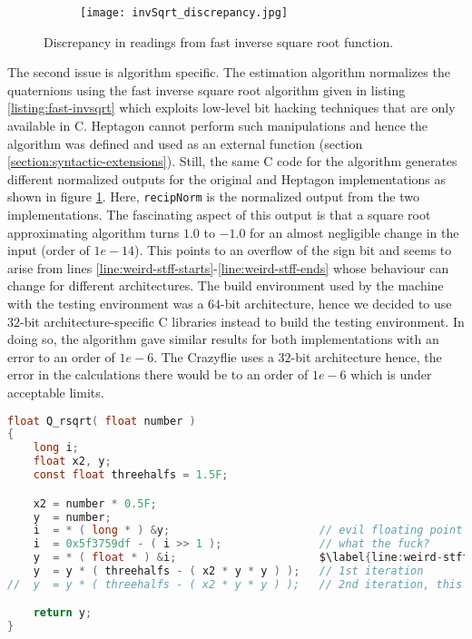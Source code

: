 \documentclass[10pt, a4paper]{article}
\newcommand{\code}[1]{\texttt{#1}}
\begin{document}
    \begin{figure}[hbt!]
        \centering
        \begin{subfigure}[b]{0.99\textwidth}
            \centering
            \texttt{[image: invSqrt\_discrepancy.jpg]}
        \end{subfigure}
        \caption{Discrepancy in readings from fast inverse square root function.}
        \label{figure:invSqrt}
    \end{figure}

    The second issue is algorithm specific. The estimation algorithm normalizes the quaternions using the fast inverse square root algorithm \cite{web:wiki-invSqrt} given in listing \ref{listing:fast-invsqrt} which exploits low-level bit hacking techniques that are only available in C. Heptagon cannot perform such manipulations and hence the algorithm was defined and used as an external function (section \ref{section:syntactic-extensions}). Still, the same C code for the algorithm generates different normalized outputs for the original and Heptagon implementations as shown in figure \ref{figure:invSqrt}. Here, \code{recipNorm} is the normalized output from the two implementations. The fascinating aspect of this output is that a square root approximating algorithm turns $1.0$ to $-1.0$ for an almost negligible change in the input (order of $1e-14$). This points to an overflow of the sign bit and seems to arise from lines \ref{line:weird-stff-starts}-\ref{line:weird-stff-ends} whose behaviour can change for different architectures. The build environment used by the machine with the testing environment was a $64$-bit architecture, hence we decided to use $32$-bit architecture-specific C libraries instead to build the testing environment. In doing so, the algorithm gave similar results for both implementations with an error to an order of $1e-6$. The Crazyflie uses a $32$-bit architecture hence, the error in the calculations there would be to an order of $1e-6$ which is under acceptable limits.

    \bigskip
    \begin{lstlisting}[caption={Fast inverse square root original C Implementation (see appendix \ref{software-reference:invSqrt})}, label={listing:fast-invsqrt}, language=C]
float Q_rsqrt( float number )
{
    long i;
    float x2, y;
    const float threehalfs = 1.5F;

    x2 = number * 0.5F;
    y  = number;
    i  = * ( long * ) &y;                       // evil floating point bit level hacking $\label{line:weird-stff-starts}$
    i  = 0x5f3759df - ( i >> 1 );               // what the fuck? 
    y  = * ( float * ) &i;                      $\label{line:weird-stff-ends}$
    y  = y * ( threehalfs - ( x2 * y * y ) );   // 1st iteration
//	y  = y * ( threehalfs - ( x2 * y * y ) );   // 2nd iteration, this can be removed

    return y;
}    \end{lstlisting}
\end{document}
